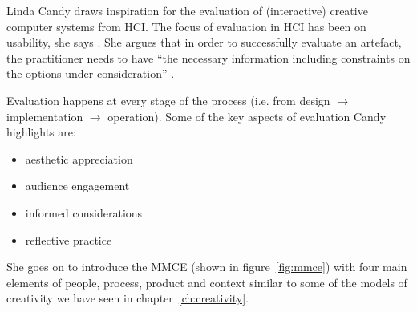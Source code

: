 Linda Candy draws inspiration for the evaluation of (interactive) creative computer systems from \ac{HCI}. The focus of evaluation in \ac{HCI} has been on usability, she says \autocite*{Candy2012}. She argues that in order to successfully evaluate an artefact, the practitioner needs to have ``the necessary information including constraints on the options under consideration'' \autocite*{Candy2012}.

Evaluation happens at every stage of the process (i.e. from design $\to$ implementation $\to$ operation). Some of the key aspects of evaluation Candy highlights are:

\begin{itemize}
  \item aesthetic appreciation
  \item audience engagement
  \item informed considerations
  \item reflective practice
\end{itemize}

She goes on to introduce the \ac{MMCE} (shown in figure~\ref{fig:mmce}) with four main elements of people, process, product and context \autocite*{Candy2012} similar to some of the models of creativity we have seen in chapter~\ref{ch:creativity}.

